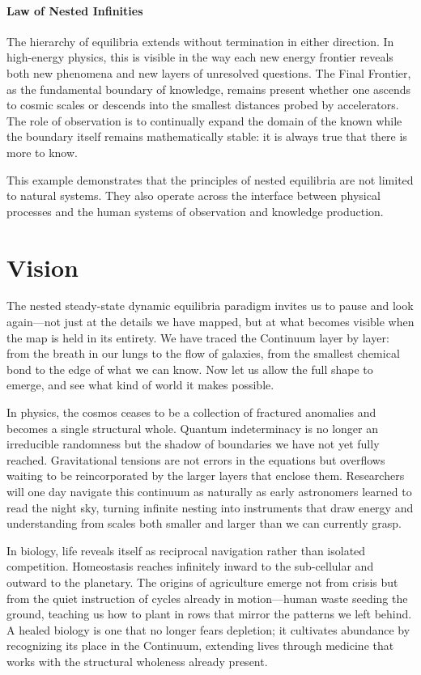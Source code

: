 \subsubsection{Law of Nested Infinities}

The hierarchy of equilibria extends without termination in either direction. In high-energy physics, this is visible in the way each new energy frontier reveals both new phenomena and new layers of unresolved questions. The Final Frontier, as the fundamental boundary of knowledge, remains present whether one ascends to cosmic scales or descends into the smallest distances probed by accelerators. The role of observation is to continually expand the domain of the known while the boundary itself remains mathematically stable: it is always true that there is more to know.

This example demonstrates that the principles of nested equilibria are not limited to natural systems. They also operate across the interface between physical processes and the human systems of observation and knowledge production.

\chapter{Vision}

The nested steady-state dynamic equilibria paradigm invites us to pause and look again—not just at the details we have mapped, but at what becomes visible when the map is held in its entirety. We have traced the Continuum layer by layer: from the breath in our lungs to the flow of galaxies, from the smallest chemical bond to the edge of what we can know. Now let us allow the full shape to emerge, and see what kind of world it makes possible.

In physics, the cosmos ceases to be a collection of fractured anomalies and becomes a single structural whole. Quantum indeterminacy is no longer an irreducible randomness but the shadow of boundaries we have not yet fully reached. Gravitational tensions are not errors in the equations but overflows waiting to be reincorporated by the larger layers that enclose them. Researchers will one day navigate this continuum as naturally as early astronomers learned to read the night sky, turning infinite nesting into instruments that draw energy and understanding from scales both smaller and larger than we can currently grasp.

In biology, life reveals itself as reciprocal navigation rather than isolated competition. Homeostasis reaches infinitely inward to the sub-cellular and outward to the planetary. The origins of agriculture emerge not from crisis but from the quiet instruction of cycles already in motion—human waste seeding the ground, teaching us how to plant in rows that mirror the patterns we left behind. A healed biology is one that no longer fears depletion; it cultivates abundance by recognizing its place in the Continuum, extending lives through medicine that works with the structural wholeness already present.

